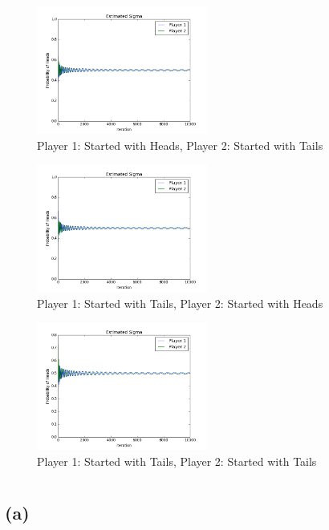 \documentclass[11pt]{article}
\begin{document}
\begin{figure}[h]
  \caption{Player 1: Started with Heads, Player 2: Started with Tails}
  \centering
  \includegraphics[width=0.5\textwidth]{ht}
\end{figure}

\begin{figure}[h]
  \caption{Player 1: Started with Tails, Player 2: Started with Heads}
  \centering
  \includegraphics[width=0.5\textwidth]{th}
\end{figure}

\begin{figure}[h]
  \caption{Player 1: Started with Tails, Player 2: Started with Tails}
  \centering
  \includegraphics[width=0.5\textwidth]{tt}
\end{figure}

\section{}

\subsection*{(a)}
\end{document}
